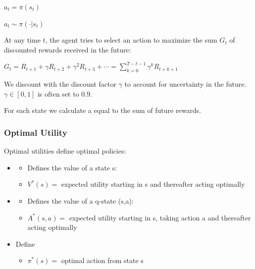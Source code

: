 \documentclass[
../../EiKI_Summary.tex,
]
{subfiles}
\begin{document}
\begin{minipage}
    [t]{0.5\textwidth}
    \begin{defbox}
        \centering
        $a_t = \pi(s_t)$
    \end{defbox}
\end{minipage}
\begin{minipage}
    [t]{0.5\textwidth}
    \begin{defbox}
        \centering
        $a_t \sim \pi(\cdot|s_t)$
    \end{defbox}
\end{minipage}

At any time $t$, the agent tries to select an action to maximize the sum $G_t$ of discounted rewards received in the future:

\begin{csmb*}
    $G_t = R_{t+1} + \gamma R_{t+2} + \gamma^2 R_{t+3} + \cdots = \sum_{k=0}^{T-t-1} \gamma^k R_{t+k+1}$
\end{csmb*}

We discount  with the discount factor $\gamma$ to account for uncertainty in the future. $\gamma \in [0,1]$ is often set to $0.9$.

For each state we calculate a  equal to the sum of future rewards.

\subsubsection{Optimal Utility}
Optimal utilities define optimal policies:

\begin{itemize}
    \item {}
    \begin{itemize}
        \item Defines the value of a state s:
        \item $V^\ast(s) =$ expected utility starting in s and thereafter acting optimally
    \end{itemize}
    \item {}
    \begin{itemize}
        \item Defines the value of a q-state (s,a):
        \item $A^\ast(s,a) =$ expected utility starting in s, taking action a and thereafter acting optimally
    \end{itemize}
    \item Define 
    \begin{itemize}
        \item $\pi^\ast(s) =$ optimal action from state s
    \end{itemize}
\end{itemize}
\end{document}
